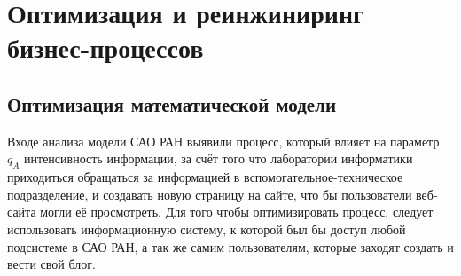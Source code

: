 \section{Оптимизация и реинжиниринг бизнес-процессов}
\subsection{Оптимизация математической модели}
Входе анализа модели САО РАН выявили процесс, который влияет на параметр $q_A$ интенсивность информации, за счёт того что лаборатории информатики приходиться обращаться за информацией в вспомогательное-техническое подразделение, и создавать новую страницу на сайте, что бы пользователи веб-сайта могли её просмотреть. Для того чтобы оптимизировать процесс, следует использовать информационную систему, к которой был бы доступ любой подсистеме в САО РАН, а так же самим пользователям, которые заходят создать и вести свой блог.
\pagebreak